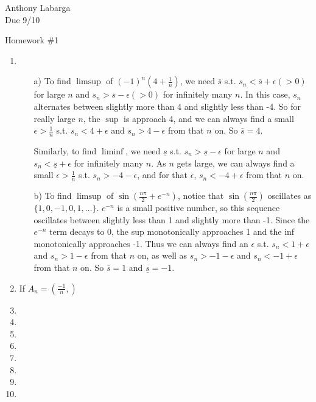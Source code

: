 \documentclass[12pt]{article}
\begin{document}
\begin{flushright}

Anthony Labarga\\
Due 9/10
\end{flushright}

\begin{center}
Homework \#1
\end{center}

\begin{enumerate}

\item

\begin{itemize}

\item[a)] To find $\limsup$ of $(-1)^n(4+\frac{1}{n})$, we need $\overline{s}$ s.t. $s_n<\overline{s}+\epsilon(>0)$ for large $n$ and $s_n>\overline{s}-\epsilon(>0)$ for infinitely many $n$. In this case, $s_n$ alternates between slightly more than 4 and slightly less than -4. So for really large $n$, the $\sup$ is approach 4, and we can always find a small $\epsilon > \frac{1}{n}$ s.t. $s_n<4+\epsilon$ and $s_n>4-\epsilon$ from that $n$ on. So $\overline{s}=4$.

Similarly, to find $\liminf$, we need $\underline{s}$ s.t. $s_n>\underline{s}-\epsilon$ for large $n$ and $s_n<\underline{s}+\epsilon$ for infinitely many $n$. As $n$ gets large, we can always find a small $\epsilon > \frac{1}{n}$ s.t. $s_n>-4-\epsilon$, and for that $\epsilon$, $s_n<-4+\epsilon$ from that $n$ on. 

\item[b)] To find $\limsup$ of $\sin(\frac{n\pi}{2}+e^{-n})$, notice that $\sin(\frac{n\pi}{2})$ oscillates as $\{1,0,-1,0,1,\dots\}$. $e^{-n}$ is a small positive number, so this sequence oscillates between slightly less than 1 and slightly more than -1. Since the $e^{-n}$ term decays to 0, the sup monotonically approaches 1 and the inf monotonically approaches -1. Thus we can always find an $\epsilon$ s.t. $s_n<1+\epsilon$ and $s_n>1-\epsilon$ from that $n$ on, as well as $s_n>-1-\epsilon$ and $s_n<-1+\epsilon$ from that $n$ on. So $\overline{s}=1$ and $\underline{s}=-1$.

\end{itemize}

\item If $A_n=(\frac{-1}{n},)$

\item

\item

\item 

\item

\item 

\item

\item

\item

\end{enumerate}
\end{document}
